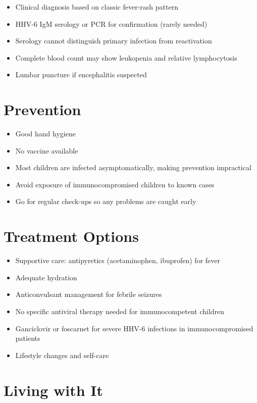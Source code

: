 \begin{itemize}[noitemsep]
  \item Clinical diagnosis based on classic fever-rash pattern
  \item HHV-6 IgM serology or PCR for confirmation (rarely needed)
  \item Serology cannot distinguish primary infection from reactivation
  \item Complete blood count may show leukopenia and relative lymphocytosis
  \item Lumbar puncture if encephalitis suspected
\end{itemize}

\section{Prevention}

\begin{itemize}[noitemsep]
  \item Good hand hygiene
  \item No vaccine available
  \item Most children are infected asymptomatically, making prevention impractical
  \item Avoid exposure of immunocompromised children to known cases
  \item Go for regular check-ups so any problems are caught early
\end{itemize}

\section{Treatment Options}

\begin{itemize}[noitemsep]
  \item Supportive care: antipyretics (acetaminophen, ibuprofen) for fever
  \item Adequate hydration
  \item Anticonvulsant management for febrile seizures
  \item No specific antiviral therapy needed for immunocompetent children
  \item Ganciclovir or foscarnet for severe HHV-6 infections in immunocompromised patients
  \item Lifestyle changes and self-care
\end{itemize}

\section{Living with It}

